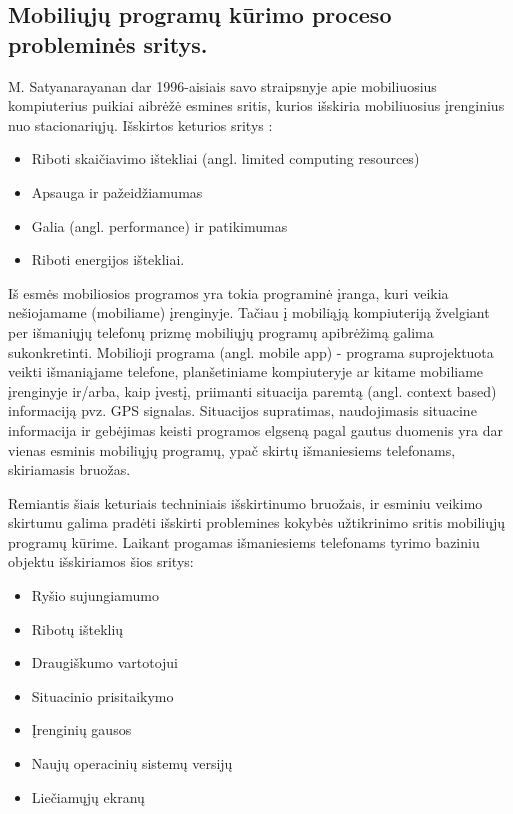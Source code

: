 \documentclass{VUMIFPSkursinis}
\begin{document}
\subsection{Mobiliųjų programų kūrimo proceso probleminės sritys.}
M. Satyanarayanan dar 1996-aisiais savo straipsnyje apie mobiliuosius kompiuterius puikiai aibrėžė esmines sritis, kurios išskiria mobiliuosius įrenginius nuo stacionariųjų. Išskirtos keturios sritys \cite{Satyanarayanan:1996:FCM:248052.248053}:
\begin{itemize}
   \item Riboti skaičiavimo ištekliai (angl. limited computing resources)
   \item Apsauga ir pažeidžiamumas
   \item Galia (angl. performance) ir patikimumas
   \item Riboti energijos ištekliai.
\end{itemize}

Iš esmės mobiliosios programos yra tokia programinė įranga, kuri veikia nešiojamame (mobiliame) įrenginyje. Tačiau į mobiliąją kompiuteriją žvelgiant per išmaniųjų telefonų prizmę mobiliųjų programų apibrėžimą galima sukonkretinti. Mobilioji programa (angl. mobile app) - programa suprojektuota veikti išmaniąjame telefone, planšetiniame kompiuteryje ar kitame mobiliame įrenginyje ir/arba, kaip įvestį, priimanti situacija paremtą (angl. context based) informaciją pvz. GPS signalas. \cite{6496451} Situacijos supratimas, naudojimasis situacine informacija ir gebėjimas keisti programos elgseną pagal gautus duomenis yra dar vienas esminis mobiliųjų programų, ypač skirtų išmaniesiems telefonams, skiriamasis bruožas.

Remiantis šiais keturiais techniniais išskirtinumo bruožais, ir esminiu veikimo skirtumu galima pradėti išskirti problemines kokybės užtikrinimo sritis mobiliųjų programų kūrime. Laikant progamas išmaniesiems telefonams tyrimo baziniu objektu išskiriamos šios sritys:
\begin{itemize}
  \item  Ryšio sujungiamumo
  \item Ribotų išteklių
  \item Draugiškumo vartotojui
  \item Situacinio prisitaikymo
  \item Įrenginių gausos
  \item Naujų operacinių sistemų versijų
  \item Liečiamųjų ekranų
\end{itemize}
\end{document}
